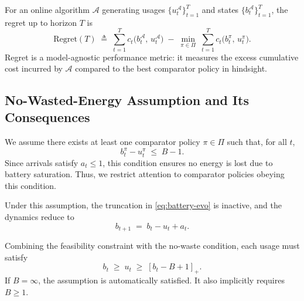 For an online algorithm \(\mathcal{A}\) generating usages \(\{u_t^{\mathcal{A}}\}_{t=1}^T\) and states \(\{b_t^{\mathcal{A}}\}_{t=1}^T\), the regret up to horizon \(T\) is
\[
\mathrm{Regret}(T)
\;\triangleq\;
\sum_{t=1}^T c_t\!\bigl(b_t^{\mathcal{A}},\,u_t^{\mathcal{A}}\bigr)
\;-\;
\min_{\pi\in\Pi}\;
\sum_{t=1}^T c_t\!\bigl(b_t^\pi,\,u_t^\pi\bigr).
\]
Regret is a model-agnostic performance metric: it measures the excess cumulative cost incurred by \(\mathcal{A}\) compared to the best comparator policy in hindsight.

\subsection{No-Wasted-Energy Assumption and Its Consequences}
We assume there exists at least one comparator policy \(\pi \in \Pi\) such that, for all \(t\),
\[
b_t^\pi - u_t^\pi \;\le\; B - 1 .
\]
Since arrivals satisfy \(a_t \le 1\), this condition ensures no energy is lost due to battery saturation.  
Thus, we restrict attention to comparator policies obeying this condition.  

Under this assumption, the truncation in \eqref{eq:battery-evo} is inactive, and the dynamics reduce to
\begin{equation}
\label{eq:evo-no-saturation}
b_{t+1} \;=\; b_t - u_t + a_t .
\end{equation}


Combining the feasibility constraint with the no-waste condition, each usage must satisfy
\begin{equation}
    \label{eq:3-coinstraints}
    b_t \;\ge\; u_t \;\ge\; [b_t - B + 1]_+ .
\end{equation}
If \(B=\infty\), the assumption is automatically satisfied.  
It also implicitly requires \(B \ge 1\).








